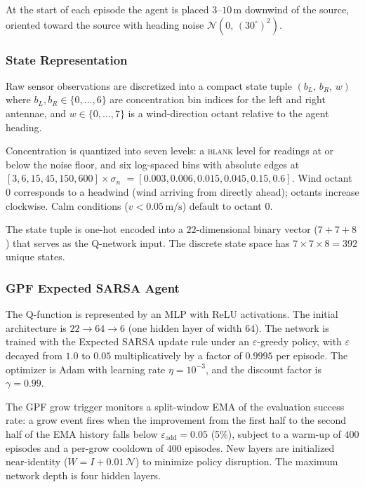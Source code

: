 At the start of each episode the agent is placed $3$--$10\,\text{m}$
downwind of the source, oriented toward the source with heading noise
$\mathcal{N}(0,\,(30^\circ)^2)$.

\subsubsection{State Representation}

Raw sensor observations are discretized into a compact state tuple
$(b_L,\, b_R,\, w)$ where $b_L, b_R \in \{0,\ldots,6\}$ are concentration
bin indices for the left and right antennae, and $w \in \{0,\ldots,7\}$ is
a wind-direction octant relative to the agent heading.

Concentration is quantized into seven levels: a \textsc{blank} level for
readings at or below the noise floor, and six log-spaced bins with absolute
edges at $[3, 6, 15, 45, 150, 600] \times \sigma_n$
$= [0.003, 0.006, 0.015, 0.045, 0.15, 0.6]$.  Wind octant $0$ corresponds
to a headwind (wind arriving from directly ahead); octants increase
clockwise.  Calm conditions ($v < 0.05\,\text{m/s}$) default to octant $0$.

The state tuple is one-hot encoded into a $22$-dimensional binary vector
($7 + 7 + 8$) that serves as the Q-network input.  The discrete state space
has $7 \times 7 \times 8 = 392$ unique states.

\subsubsection{GPF Expected SARSA Agent}

The Q-function is represented by an MLP with ReLU activations.  The initial
architecture is $22 \to 64 \to 6$ (one hidden layer of width $64$).  The
network is trained with the Expected SARSA update rule under an
$\varepsilon$-greedy policy, with $\varepsilon$ decayed from $1.0$ to
$0.05$ multiplicatively by a factor of $0.9995$ per episode.  The optimizer
is Adam with learning rate $\eta = 10^{-3}$, and the discount factor is
$\gamma = 0.99$.

The GPF grow trigger monitors a split-window EMA of the evaluation success
rate: a grow event fires when the improvement from the first half to the
second half of the EMA history falls below $\varepsilon_{\text{add}} = 0.05$
(5\%), subject to a warm-up of $400$ episodes and a per-grow cooldown of
$400$ episodes.  New layers are initialized near-identity
($W = I + 0.01\,\mathcal{N}$) to minimize policy disruption.
The maximum network depth is four hidden layers.

